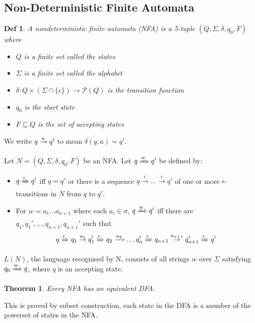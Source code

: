 \documentclass{article}
\newtheorem{thm}{Theorem}
\newtheorem{defn}[dummy]{Def}
\newcommand{\xto}[1]{ \overset{#1}{\to} }
\newcommand{\Trans}[3]{ #1 \xrightarrow{ #2 }\mathrel{\vphantom{\to}} #3 }
\newcommand{\dTrans}[3]{ #1 \xRightarrow{ #2 }\mathrel{\vphantom{\to}} #3 }
\begin{document}
    \subsection{Non-Deterministic Finite Automata}

    \begin{defn}

        A nondeterministic finite automata (NFA) is a 5-tuple $(Q, \Sigma, \delta, q_0, F)$ where
        \begin{itemize}
            \item $Q$ is a finite set called the states
            \item $\Sigma$ is a finite set called the alphabet
            \item $\delta : Q \times (\Sigma \cap \{ \epsilon \}) \to \mathcal{P}(Q)$ is the transition function
            \item $q_0$ is the start state
            \item $F \subseteq Q$ is the set of accepting states
        \end{itemize}
    
    \end{defn}

    We write $\Trans{q}{a}{q'}$ to mean $\delta(q,a) = q'$. \\ \\

    Let $N = (Q, \Sigma, \delta, q_0, F)$ be an NFA. Let $\dTrans{q}{w}{q'}$ be defined by:
    \begin{itemize}
        \item $\dTrans{q}{\epsilon}{q'}$ iff $q = q'$ or there is a sequence $q \xto{\epsilon} \ldots \xto{\epsilon} q'$ of one or more $\epsilon$-transitions in $N$ from $q$ to $q'$.
        \item For $w = a_1\ldots a_{n+1}$ where each $a_i \in \sigma$, $\dTrans{q}{w}{q'}$ iff there are $q_1, q_1', \ldots, q_{n+1}, q_{n+1}'$ such that
        \[ \dTrans{q}{\epsilon}{q_1} \xto{a_1} \dTrans{q_1'}{\epsilon}{q_2} \xrightarrow{a_2} \ldots \dTrans{q_n'}{\epsilon}{q_{n+1}} \xto{a_{n+1}} \dTrans{q_{n+1}'}{\epsilon}{q'} \]
    \end{itemize}

    $L(N)$, the language recognised by N, consists of all strings $w$ over $\Sigma$ satisfying $\dTrans{q_0}{w}{q}$, where $q$ is an accepting state. 
    \begin{thm}
    Every NFA has an equivalent DFA. 
    \end{thm}
    This is proved by subset construction, each state in the DFA is a member of the powerset of states in the NFA. 
\end{document}
